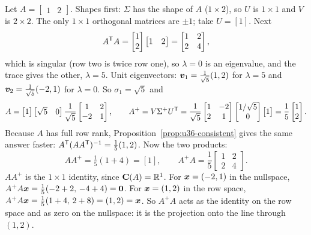 \begin{example}\label{ex:u36-row}
Let $A=\begin{bmatrix}1&2\end{bmatrix}$. Shapes first: $\Sigma$ has the shape of $A$ ($1\times 2$), so $U$ is $1\times 1$ and $V$ is $2\times 2$. The only $1\times1$ orthogonal matrices are $\pm1$; take $U=[1]$. Next
\[
A^{\mathsf{T}} A=\begin{bmatrix}1\\2\end{bmatrix}\begin{bmatrix}1&2\end{bmatrix}=\begin{bmatrix}1&2\\2&4\end{bmatrix},
\]
which is singular (row two is twice row one), so $\lambda=0$ is an eigenvalue, and the trace gives the other, $\lambda=5$. Unit eigenvectors: $\boldsymbol{v}_1=\tfrac{1}{\sqrt5}(1,2)$ for $\lambda=5$ and $\boldsymbol{v}_2=\tfrac{1}{\sqrt5}(-2,1)$ for $\lambda=0$. So $\sigma_1=\sqrt5$ and
\[
A=\begin{bmatrix}1\end{bmatrix}\begin{bmatrix}\sqrt5&0\end{bmatrix}\frac{1}{\sqrt5}\begin{bmatrix}1&2\\-2&1\end{bmatrix},\qquad
A^{+}=V\Sigma^{+}U^{\mathsf{T}}=\frac{1}{\sqrt5}\begin{bmatrix}1&-2\\2&1\end{bmatrix}\begin{bmatrix}1/\sqrt5\\0\end{bmatrix}\begin{bmatrix}1\end{bmatrix}=\frac15\begin{bmatrix}1\\2\end{bmatrix}.
\]
Because $A$ has full row rank, Proposition~\ref{prop:u36-consistent} gives the same answer faster: $A^{\mathsf{T}}(AA^{\mathsf{T}})^{-1}=\tfrac15(1,2)$. Now the two products:
\[
AA^{+}=\tfrac15(1+4)=[1],\qquad A^{+}A=\frac15\begin{bmatrix}1&2\\2&4\end{bmatrix}.
\]
$AA^{+}$ is the $1\times1$ identity, since $\mathbf{C}(A)=\mathbb{R}^1$. For $\boldsymbol{x}=(-2,1)$ in the nullspace, $A^{+}A\boldsymbol{x}=\tfrac15(-2+2,\,-4+4)=\boldsymbol{0}$. For $\boldsymbol{x}=(1,2)$ in the row space, $A^{+}A\boldsymbol{x}=\tfrac15(1+4,\,2+8)=(1,2)=\boldsymbol{x}$. So $A^{+}A$ acts as the identity on the row space and as zero on the nullspace: it is the projection onto the line through $(1,2)$.
\end{example}

